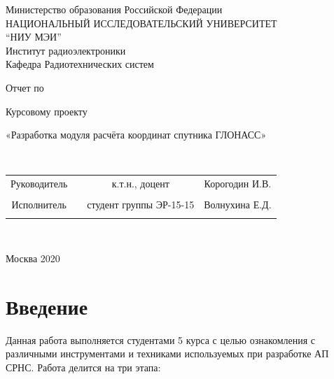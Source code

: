 \documentclass[]{article}
\begin{document}
	
	\begin{center}
		\hfill \break
		\large{Министерство образования Российской Федерации}\\
		\large{НАЦИОНАЛЬНЫЙ ИССЛЕДОВАТЕЛЬСКИЙ УНИВЕРСИТЕТ}\\ 
		\large{“НИУ МЭИ”}\\
		
		\hfill \break
		\normalsize{Институт радиоэлектроники}\\
		\hfill \break
		\normalsize{Кафедра Радиотехнических систем}\\
		\hfill\break
		\hfill \break
		\hfill \break
		\hfill \break
		\large{Отчет по 
			
			Курсовому проекту
			
			«Разработка модуля расчёта координат спутника ГЛОНАСС»	}\\
		\hfill \break
		\hfill \break
		\hfill \break
		
		\hfill \break
		
		\hfill \break
		
		\hfill \break
		\hfill \break
	\end{center}
	
	\hfill \break
	\hfill \break
	
	\normalsize{ 
		\begin{tabular}{cccc}
			
			
			Руководитель & \underline{\hspace{3cm}}& к.т.н., доцент & Корогодин И.В. \\\\
			
			Исполнитель & \underline{\hspace{3cm}} &студент группы ЭР-15-15 &Волнухина Е.Д. \\\\
		\end{tabular}
	}\\
	\hfill \break
	\hfill \break
	\begin{center} Москва 2020 \end{center}
	\thispagestyle{empty} %
	
	\tableofcontents
	
	
	\newpage
	\section{Введение}
	Данная работа выполняется студентами 5 курса с целью ознакомления с различными инструментами и техниками используемых при  разработке АП СРНС. Работа делится на три этапа:
	
\end{document}
